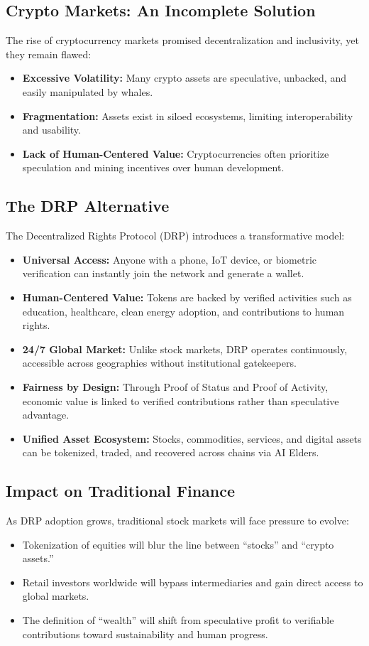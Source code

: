 \documentclass[11pt,a4paper]{article}
\begin{document}
\subsection{Crypto Markets: An Incomplete Solution}
The rise of cryptocurrency markets promised decentralization and inclusivity, yet they remain flawed:
\begin{itemize}
    \item \textbf{Excessive Volatility:} Many crypto assets are speculative, unbacked, and easily manipulated by whales.
    \item \textbf{Fragmentation:} Assets exist in siloed ecosystems, limiting interoperability and usability.
    \item \textbf{Lack of Human-Centered Value:} Cryptocurrencies often prioritize speculation and mining incentives over human development.
\end{itemize}

\subsection{The DRP Alternative}
The Decentralized Rights Protocol (DRP) introduces a transformative model:
\begin{itemize}
    \item \textbf{Universal Access:} Anyone with a phone, IoT device, or biometric verification can instantly join the network and generate a wallet.
    \item \textbf{Human-Centered Value:} Tokens are backed by verified activities such as education, healthcare, clean energy adoption, and contributions to human rights.
    \item \textbf{24/7 Global Market:} Unlike stock markets, DRP operates continuously, accessible across geographies without institutional gatekeepers.
    \item \textbf{Fairness by Design:} Through Proof of Status and Proof of Activity, economic value is linked to verified contributions rather than speculative advantage.
    \item \textbf{Unified Asset Ecosystem:} Stocks, commodities, services, and digital assets can be tokenized, traded, and recovered across chains via AI Elders.
\end{itemize}

\subsection{Impact on Traditional Finance}
As DRP adoption grows, traditional stock markets will face pressure to evolve:
\begin{itemize}
    \item Tokenization of equities will blur the line between ``stocks'' and ``crypto assets.''
    \item Retail investors worldwide will bypass intermediaries and gain direct access to global markets.
    \item The definition of ``wealth'' will shift from speculative profit to verifiable contributions toward sustainability and human progress.
\end{itemize}
\end{document}

